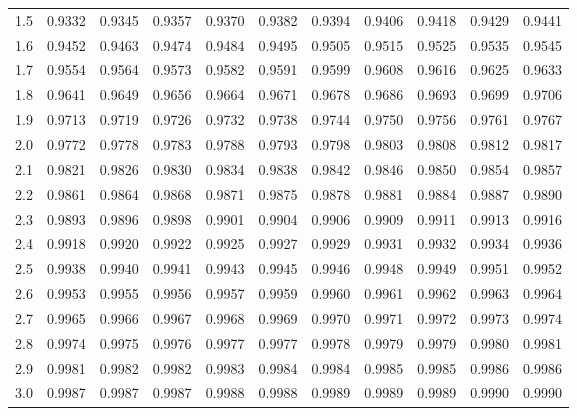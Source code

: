 \documentclass[12pt,a4paper,leqno]{report}
\theoremstyle{plain}
\theoremstyle{definition}
\begin{document}
\begin{table}[ht]
\begin{tabular}{rrrrrrrrrrr}
		1.5 & 0.9332 & 0.9345 & 0.9357 & 0.9370 & 0.9382 & 0.9394 & 0.9406 & 0.9418 & 0.9429 & 0.9441 \\ 
		1.6 & 0.9452 & 0.9463 & 0.9474 & 0.9484 & 0.9495 & 0.9505 & 0.9515 & 0.9525 & 0.9535 & 0.9545 \\ 
		1.7 & 0.9554 & 0.9564 & 0.9573 & 0.9582 & 0.9591 & 0.9599 & 0.9608 & 0.9616 & 0.9625 & 0.9633 \\ 
		1.8 & 0.9641 & 0.9649 & 0.9656 & 0.9664 & 0.9671 & 0.9678 & 0.9686 & 0.9693 & 0.9699 & 0.9706 \\ 
		1.9 & 0.9713 & 0.9719 & 0.9726 & 0.9732 & 0.9738 & 0.9744 & 0.9750 & 0.9756 & 0.9761 & 0.9767 \\ 
		2.0 & 0.9772 & 0.9778 & 0.9783 & 0.9788 & 0.9793 & 0.9798 & 0.9803 & 0.9808 & 0.9812 & 0.9817 \\ 
		2.1 & 0.9821 & 0.9826 & 0.9830 & 0.9834 & 0.9838 & 0.9842 & 0.9846 & 0.9850 & 0.9854 & 0.9857 \\ 
		2.2 & 0.9861 & 0.9864 & 0.9868 & 0.9871 & 0.9875 & 0.9878 & 0.9881 & 0.9884 & 0.9887 & 0.9890 \\ 
		2.3 & 0.9893 & 0.9896 & 0.9898 & 0.9901 & 0.9904 & 0.9906 & 0.9909 & 0.9911 & 0.9913 & 0.9916 \\ 
		2.4 & 0.9918 & 0.9920 & 0.9922 & 0.9925 & 0.9927 & 0.9929 & 0.9931 & 0.9932 & 0.9934 & 0.9936 \\ 
		2.5 & 0.9938 & 0.9940 & 0.9941 & 0.9943 & 0.9945 & 0.9946 & 0.9948 & 0.9949 & 0.9951 & 0.9952 \\ 
		2.6 & 0.9953 & 0.9955 & 0.9956 & 0.9957 & 0.9959 & 0.9960 & 0.9961 & 0.9962 & 0.9963 & 0.9964 \\ 
		2.7 & 0.9965 & 0.9966 & 0.9967 & 0.9968 & 0.9969 & 0.9970 & 0.9971 & 0.9972 & 0.9973 & 0.9974 \\ 
		2.8 & 0.9974 & 0.9975 & 0.9976 & 0.9977 & 0.9977 & 0.9978 & 0.9979 & 0.9979 & 0.9980 & 0.9981 \\ 
		2.9 & 0.9981 & 0.9982 & 0.9982 & 0.9983 & 0.9984 & 0.9984 & 0.9985 & 0.9985 & 0.9986 & 0.9986 \\ 
		3.0 & 0.9987 & 0.9987 & 0.9987 & 0.9988 & 0.9988 & 0.9989 & 0.9989 & 0.9989 & 0.9990 & 0.9990 \\ 
		\hline
	\end{tabular}
\end{table}

\printindex
\end{document}
